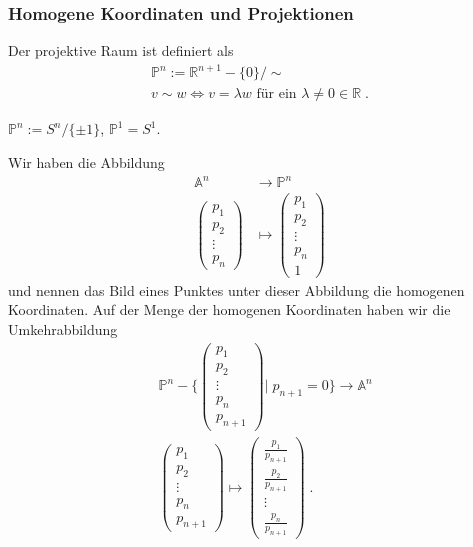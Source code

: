 \subsubsection{Homogene Koordinaten und Projektionen}
\label{subsub:math:affine-space:homog-coords-projection}
\begin{Definition}
Der projektive  Raum ist definiert als
\begin{align*}
\mathbb{P}^n := \mathbb{R}^{n+1} - \{ 0\} / \sim \\
v \sim w \Leftrightarrow v = \lambda w \text{ für ein } \lambda \neq 0 \in \mathbb{R} \; . 
\end{align*}
\end{Definition}

\begin{Satz}
$\mathbb{P}^n := S^{n}/ \{\pm 1 \}$, $\mathbb{P}^1 = S^{1}$.
\end{Satz}

Wir haben die Abbildung
\begin{align*}
\mathbb{A}^n & \to \mathbb{P}^n \\
\begin{pmatrix} p_1 \\ p_2 \\ \vdots \\ p_n \end{pmatrix} & \mapsto \begin{pmatrix} p_1 \\ p_2 \\ \vdots \\ p_n  \\  1\end{pmatrix} 
\end{align*}
und nennen das Bild eines Punktes unter dieser Abbildung die homogenen Koordinaten.
Auf der Menge der homogenen Koordinaten haben wir die Umkehrabbildung
\begin{align*}
& \mathbb{P}^n - \Biggl \{ \begin{pmatrix} p_1 \\ p_2 \\ \vdots \\ p_n  \\  p_{n+1} \end{pmatrix} \Bigg | \; p_{n+1} = 0 \Biggr \}   \to \mathbb{A}^n \\
& \begin{pmatrix} p_1 \\ p_2 \\ \vdots \\ p_n  \\  p_{n+1} \end{pmatrix}   \mapsto \begin{pmatrix}  \frac{p_1}{ p_{n+1}} \\ \frac{p_2}{ p_{n+1}}  \\ \vdots \\ \frac{p_n}{ p_{n+1}}  \end{pmatrix}  \; .
\end{align*}


